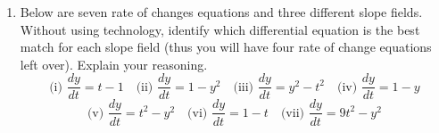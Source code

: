 \begin{enumerate}[resume]
\item Below are seven rate of changes equations and three different slope fields. Without using technology, identify which differential equation is the best match for each slope field (thus you will have four rate of change equations left over). Explain your reasoning. \label{01problem8}
\[
\text{(i) } \frac{dy}{dt}=t-1 \quad \text{(ii) } \frac{dy}{dt}=1-y^2 \quad \text{(iii) } \frac{dy}{dt}=y^2-t^2 \quad \text{(iv) } \frac{dy}{dt}=1-y
\]
\[
\text{(v) } \frac{dy}{dt}=t^2-y^2 \quad \text{(vi) } \frac{dy}{dt}=1-t \quad \text{(vii) } \frac{dy}{dt}=9t^2-y^2
\]


\end{enumerate}
